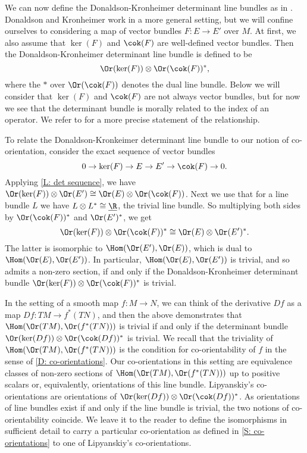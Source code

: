 We can now define the Donaldson-Kronheimer determinant line bundles as in \cite[Section 5.2.1]{DoKr90}. Donaldson and Kronheimer work in a more general setting, but we will confine ourselves to considering a map of vector bundles $F:E\to E'$ over $M$. At first, we also assume that $\ker(F)$ and $\cok(F)$ are well-defined vector bundles. Then the Donaldson-Kronheimer determinant line bundle is defined to be   $$\Or(\ker(F))\otimes \Or(\cok(F))^*,$$ 
where the $*$ over $\Or(\cok(F))$ denotes the dual line bundle. Below we will consider that $\ker(F)$ and $\cok(F)$ are not always vector bundles, but for now we see that the determinant bundle is morally related to the index of an operator. We refer to \cite[Section 5.2.1]{DoKr90} for a more precise statement of the relationship.

To relate the Donaldson-Kronkeimer determinant line bundle to our notion of co-orientation, consider the exact sequence of vector bundles
\begin{equation*}
0\to \ker(F) \to  E \to E' \to \cok(F) \to 0.
\end{equation*}
Applying \cref{L: det sequence}, we have $\Or(\ker(F))\otimes \Or(E')\cong \Or(E)\otimes \Or(\cok(F))$. Next we use that for a line bundle $L$ we have $L\otimes L^*\cong \underline{\R}$, the trivial line bundle. So multiplying both sides by $\Or(\cok(F))^*$ and $\Or(E')^*$, we get $$\Or(\ker(F))\otimes \Or(\cok(F))^*\cong \Or(E)\otimes \Or(E')^*.$$
The latter is isomorphic to $\Hom(\Or(E'),\Or(E))$, which is dual to $\Hom(\Or(E),\Or(E'))$. In particular, $\Hom(\Or(E),\Or(E'))$ is trivial, and so admits a non-zero section, if and only if the Donaldson-Kronheimer determinant bundle $\Or(\ker(F))\otimes \Or(\cok(F))^*$ is trivial. 

In the setting of a smooth map $f:M\to N$, we can think of the derivative $Df$ as a map $Df:TM\to f^*(TN)$, and then the above demonstrates that $\Hom(\Or(TM),\Or(f^*(TN)))$ is trivial if and only if the determinant bundle $\Or(\ker(Df))\otimes \Or(\cok(Df))^*$ is trivial. We recall that the triviality of $\Hom(\Or(TM),\Or(f^*(TN)))$ is the condition for co-orientability of $f$ in the sense of \cref{D: co-orientations}.  Our co-orientations in this setting are equivalence classes of non-zero sections of $\Hom(\Or(TM),\Or(f^*(TN)))$ up to positive scalars or, equivalently, orientations of this line bundle. Lipyanskiy's co-orientations are orientations of $\Or(\ker(Df))\otimes \Or(\cok(Df))^*$. As orientations of line bundles exist if and only if the line bundle is trivial, the two notions of co-orientability coincide. We leave it to the reader to define the isomorphisms in sufficient detail to carry a particular co-orientation as defined in \cref{S: co-orientations} to one of Lipyanskiy's co-orientations.






